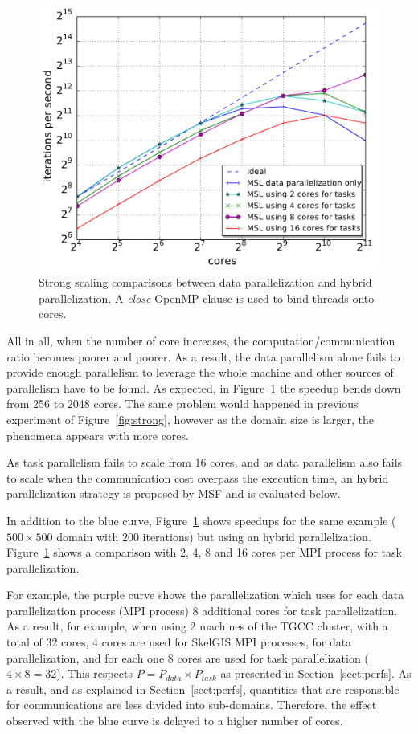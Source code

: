 \begin{figure}[th]\begin{center}
  \includegraphics[width=.6\textwidth]{../results/task_scaling/500_200/base_close_median.pdf}
  \caption{Strong scaling comparisons between data parallelization and hybrid parallelization. A \emph{close} OpenMP clause is used to bind threads onto cores.}
  \label{fig:close}
\end{center}\end{figure}

All in all, when the number of core increases, the computation/communication ratio becomes poorer and poorer. As a result, the data parallelism alone fails to provide enough parallelism to leverage the whole machine and other sources of parallelism have to be found. As expected, in  Figure~\ref{fig:close} the speedup bends down from 256 to 2048 cores. The same problem would happened in previous experiment of Figure~\ref{fig:strong}, however as the domain size is larger, the phenomena appears with more cores. 

As task parallelism fails to scale from 16 cores, and as data parallelism also fails to scale when the communication cost overpass the execution time, an hybrid parallelization strategy is proposed by MSF and is evaluated below.

In addition to the blue curve, Figure~\ref{fig:close} shows speedups for the same example ($500 \times 500$ domain with $200$ iterations) but using an hybrid parallelization. Figure~\ref{fig:close} shows a comparison with 2, 4, 8 and 16 cores per MPI process for task parallelization.

For example, the purple curve shows the parallelization which uses for each data parallelization process (\ie MPI process) 8 additional cores for task parallelization. As a result, for example, when using 2 machines of the TGCC cluster, with a total of 32 cores, 4 cores are used for SkelGIS MPI processes, for data parallelization, and for each one 8 cores are used for task parallelization ($4 \times 8 = 32$). This respects $P = P_{data} \times P_{task}$ as presented in Section~\ref{sect:perfs}.
As a result, and as explained in Section~\ref{sect:perfs}, quantities that are responsible for communications are less divided into sub-domains. Therefore, the effect observed with the blue curve is delayed to a higher number of cores.

